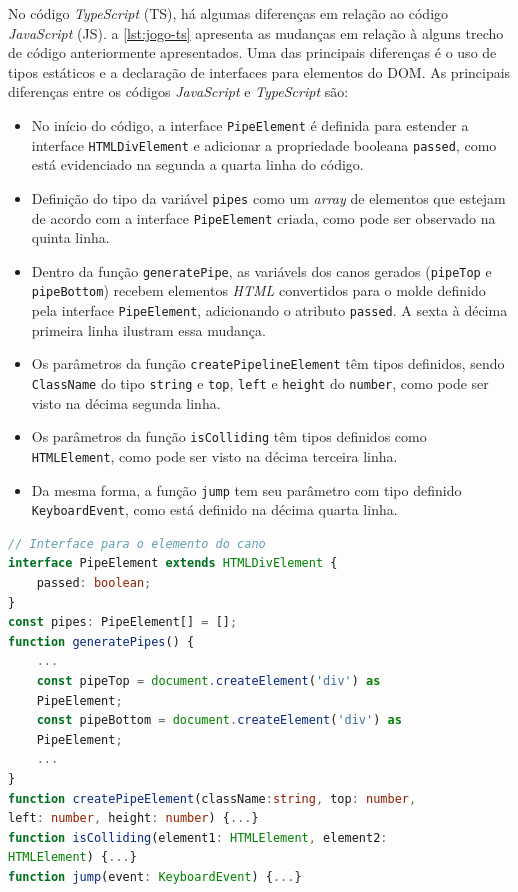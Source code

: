 No código \textit{TypeScript} (TS), há algumas diferenças em relação ao código \textit{JavaScript} (JS). a \autoref{lst:jogo-ts} apresenta as mudanças em relação à alguns trecho de código anteriormente apresentados. Uma das principais diferenças é o uso de tipos estáticos e a declaração de interfaces para elementos do DOM. As principais diferenças entre os códigos \textit{JavaScript} e \textit{TypeScript} são: 
\begin{itemize}
    \item No início do código, a interface \texttt{PipeElement} é definida para estender a interface \texttt{HTMLDivElement} e adicionar a propriedade booleana \texttt{passed}, como está evidenciado na segunda a quarta linha do código. 

    \item Definição do tipo da variável \texttt{pipes} como um \textit{array} de elementos que estejam de acordo com a interface \texttt{PipeElement} criada, como pode ser observado na quinta linha.
    
    \item Dentro da função \texttt{generatePipe}, as variávels dos canos gerados (\texttt{pipeTop} e \texttt{pipeBottom}) recebem elementos \textit{HTML} convertidos para o molde definido pela interface \texttt{PipeElement}, adicionando o atributo \texttt{passed}. A sexta à décima primeira linha ilustram essa mudança.

     \item Os parâmetros da função \texttt{createPipelineElement} têm tipos definidos, sendo \texttt{ClassName} do tipo \texttt{string} e \texttt{top}, \texttt{left} e \texttt{height} do \texttt{number}, como pode ser visto na décima segunda linha.
    
    \item Os parâmetros da função \texttt{isColliding} têm tipos definidos como \texttt{HTMLElement}, como pode ser visto na décima terceira linha.
    
    \item Da mesma forma, a função \texttt{jump} tem seu parâmetro com tipo definido \texttt{KeyboardEvent}, como está definido na décima quarta linha.
\end{itemize}

\Needspace{0.3\textheight}
\begin{lstlisting}[language=TypeScript, caption={Mudanças no código do projeto exemplo ao desenvolver em \textit{TypeScript}}, label=lst:jogo-ts]
// Interface para o elemento do cano
interface PipeElement extends HTMLDivElement {
    passed: boolean;
}
const pipes: PipeElement[] = [];
function generatePipes() {
    ...
    const pipeTop = document.createElement('div') as
    PipeElement;
    const pipeBottom = document.createElement('div') as
    PipeElement;
    ...
}
function createPipeElement(className:string, top: number, 
left: number, height: number) {...}
function isColliding(element1: HTMLElement, element2: 
HTMLElement) {...}
function jump(event: KeyboardEvent) {...}
\end{lstlisting}

